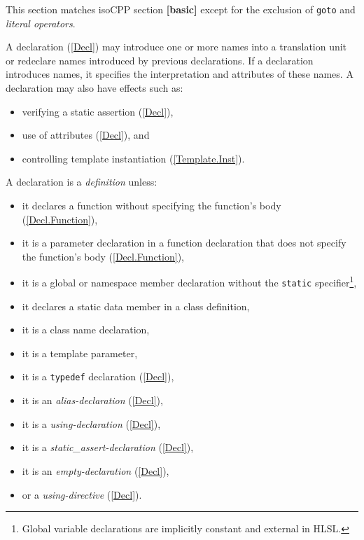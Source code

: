 \begin{note}
  This section matches \gls{isoCPP} section \textbf{[basic]} except for the
  exclusion of \texttt{goto} and \textit{literal operators}.
\end{note}


\p A declaration (\ref{Decl}) may introduce one or more names into a translation
unit or redeclare names introduced by previous declarations. If a declaration
introduces names, it specifies the interpretation and attributes of these names.
A declaration may also have effects such as:
\begin{itemize}
\item verifying a static assertion (\ref{Decl}),
\item use of attributes (\ref{Decl}), and
\item controlling template instantiation (\ref{Template.Inst}).
\end{itemize}

\p A declaration is a \textit{definition} unless:
\begin{itemize}
\item it declares a function without specifying the function's body
(\ref{Decl.Function}),
\item it is a parameter declaration in a function declaration that does not
specify the function's body (\ref{Decl.Function}),
\item it is a global or namespace member declaration without the \texttt{static}
specifier\footnote{Global variable declarations are implicitly constant and
external in HLSL.},
\item it declares a static data member in a class definition,
\item it is a class name declaration,
\item it is a template parameter,
\item it is a \texttt{typedef} declaration (\ref{Decl}),
\item it is an \textit{alias-declaration} (\ref{Decl}),
\item it is a \textit{using-declaration} (\ref{Decl}),
\item it is a \textit{static\_assert-declaration} (\ref{Decl}),
\item it is an \textit{empty-declaration} (\ref{Decl}),
\item or a \textit{using-directive} (\ref{Decl}).
\end{itemize}

